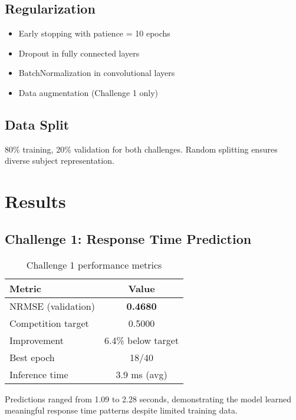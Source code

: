 \documentclass[10pt,twocolumn]{article}
\begin{document}
\subsection{Regularization}
\begin{itemize}
    \item Early stopping with patience = 10 epochs
    \item Dropout in fully connected layers
    \item BatchNormalization in convolutional layers
    \item Data augmentation (Challenge 1 only)
\end{itemize}

\subsection{Data Split}
80\% training, 20\% validation for both challenges. Random splitting ensures diverse subject representation.

\section{Results}

\subsection{Challenge 1: Response Time Prediction}
\begin{table}[h]
\centering
\small
\begin{tabular}{lc}
\toprule
\textbf{Metric} & \textbf{Value} \\
\midrule
NRMSE (validation) & \textbf{0.4680} \\
Competition target & 0.5000 \\
Improvement & 6.4\% below target \\
Best epoch & 18/40 \\
Inference time & 3.9 ms (avg) \\
\bottomrule
\end{tabular}
\caption{Challenge 1 performance metrics}
\end{table}

Predictions ranged from 1.09 to 2.28 seconds, demonstrating the model learned meaningful response time patterns despite limited training data.
\end{document}
